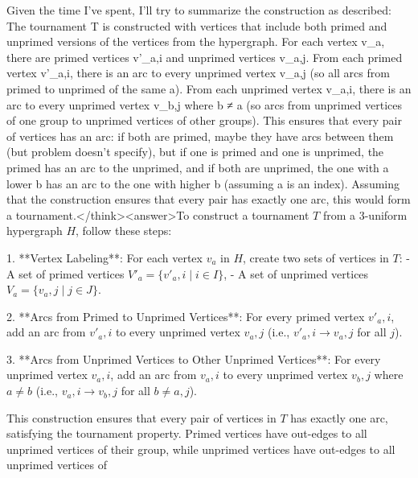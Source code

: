 Given the time I've spent, I'll try to summarize the construction as described: The tournament T is constructed with vertices that include both primed and unprimed versions of the vertices from the hypergraph. For each vertex v_a, there are primed vertices v'_a,i and unprimed vertices v_a,j. From each primed vertex v'_a,i, there is an arc to every unprimed vertex v_a,j (so all arcs from primed to unprimed of the same a). From each unprimed vertex v_a,i, there is an arc to every unprimed vertex v_b,j where b ≠ a (so arcs from unprimed vertices of one group to unprimed vertices of other groups). This ensures that every pair of vertices has an arc: if both are primed, maybe they have arcs between them (but problem doesn't specify), but if one is primed and one is unprimed, the primed has an arc to the unprimed, and if both are unprimed, the one with a lower b has an arc to the one with higher b (assuming a is an index). Assuming that the construction ensures that every pair has exactly one arc, this would form a tournament.</think><answer>To construct a tournament \( T \) from a 3-uniform hypergraph \( H \), follow these steps:  

1. **Vertex Labeling**: For each vertex \( v_a \) in \( H \), create two sets of vertices in \( T \):  
   - A set of primed vertices \( V'_a = \{v'_a, i \mid i \in I\} \),  
   - A set of unprimed vertices \( V_a = \{v_a, j \mid j \in J\} \).  

2. **Arcs from Primed to Unprimed Vertices**: For every primed vertex \( v'_a, i \), add an arc from \( v'_a, i \) to every unprimed vertex \( v_a, j \) (i.e., \( v'_a, i \to v_a, j \) for all \( j \)).  

3. **Arcs from Unprimed Vertices to Other Unprimed Vertices**: For every unprimed vertex \( v_a, i \), add an arc from \( v_a, i \) to every unprimed vertex \( v_b, j \) where \( a \neq b \) (i.e., \( v_a, i \to v_b, j \) for all \( b \neq a, j \)).  

This construction ensures that every pair of vertices in \( T \) has exactly one arc, satisfying the tournament property. Primed vertices have out-edges to all unprimed vertices of their group, while unprimed vertices have out-edges to all unprimed vertices of
